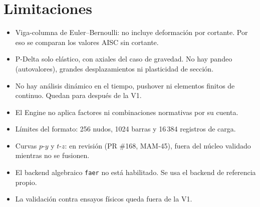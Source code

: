 \chapter{Limitaciones}
\begin{itemize}
\item Viga-columna de Euler--Bernoulli: no incluye deformación por cortante. Por eso se comparan los valores AISC sin cortante.
\item P-Delta solo elástico, con axiales del caso de gravedad. No hay pandeo (autovalores), grandes desplazamientos ni plasticidad de sección.
\item No hay análisis dinámico en el tiempo, pushover ni elementos finitos de continuo. Quedan para después de la V1.
\item El Engine no aplica factores ni combinaciones normativas por su cuenta.
\item Límites del formato: 256 nudos, 1024 barras y 16\,384 registros de carga.
\item Curvas $p$-$y$ y $t$-$z$: en revisión (PR \#168, MAM-45), fuera del núcleo validado mientras no se fusionen.
\item El backend algebraico \texttt{faer} no está habilitado. Se usa el backend de referencia propio.
\item La validación contra ensayos físicos queda fuera de la V1.
\end{itemize}
